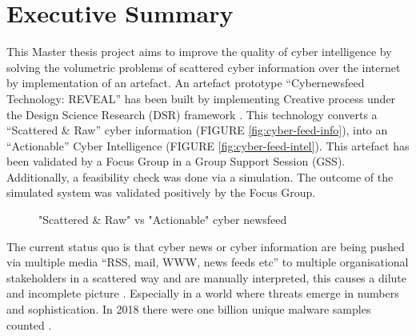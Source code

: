 
\chapter{Executive Summary} %

\label{Chapter0_Executive Summary} %






This Master thesis project aims to improve the quality of cyber intelligence by solving the volumetric problems of scattered cyber information over the internet by implementation of an artefact. 
An artefact prototype 
\enquote{Cybernewsfeed Technology: REVEAL} 
has been built by implementing Creative process 
\citep{mednick1962associative} under the Design Science Research (DSR) framework 
\citep{bobbert2017exploring}. 
This technology converts a \enquote{Scattered \& Raw} 
cyber information 
(FIGURE \ref{fig:cyber-feed-info}), 
into an \enquote{Actionable} Cyber Intelligence (FIGURE \ref{fig:cyber-feed-intel}). 
This artefact has been validated by a Focus Group in a Group Support Session (GSS)\citep{briggs2001thinklets}. 
Additionally, a feasibility check was done via a simulation. 
The outcome of the simulated system was validated positively by the Focus Group. 


\begin{figure}[!htbp]
  \centering
  \hspace{1em}
  \caption{"Scattered \& Raw" vs "Actionable" cyber newsfeed}
\end{figure}


The current status quo is that cyber news or cyber information are being pushed via multiple media \enquote{RSS, mail, WWW, news feeds etc} to multiple organisational stakeholders in a scattered way \citep{schales2011stream}
and are manually interpreted, 
this causes a dilute and incomplete picture 
\citep{liao2016acing}. 
Especially in a world where threats emerge in numbers and sophistication. In 2018 there were one billion unique malware samples counted \citep{kucuk2020deceiving}.
 
